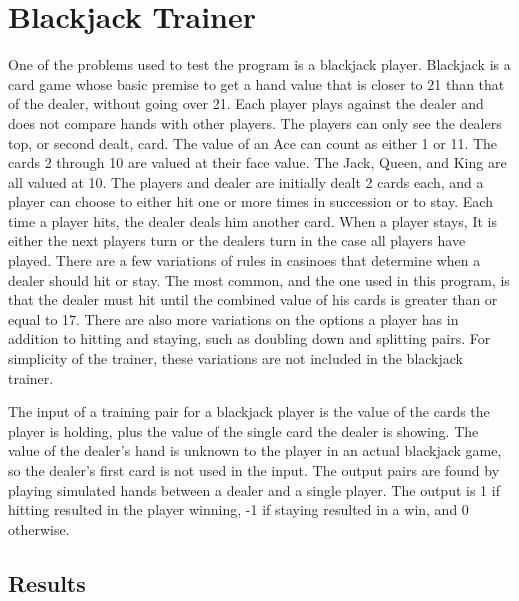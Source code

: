 \chapter[Blackjack Trainer]{Blackjack Trainer}
One of the problems used to test the program is a blackjack player. 
Blackjack is a card game whose basic premise to get a hand value that is closer to 21 than that of the dealer, without going over 21. 
Each player plays against the dealer and does not compare hands with other players. 
The players can only see the dealers top, or second dealt, card. 
The value of an Ace can count as either 1 or 11. 
The cards 2 through 10 are valued at their face value. 
The Jack, Queen, and King are all valued at 10. 
The players and dealer are initially dealt 2 cards each, and a player can choose to either hit one or more times in succession or to stay. 
Each time a player hits, the dealer deals him another card. 
When a player stays, It is either the next players turn or the dealers turn in the case all players have played. 
There are a few variations of rules in casinoes that determine when a dealer should hit or stay. 
The most common, and the one used in this program, is that the dealer must hit until the combined value of his cards is greater than or equal to 17. 
There are also more variations on the options a player has in addition to hitting and staying, such as doubling down and splitting pairs. 
For simplicity of the trainer, these variations are not included in the blackjack trainer.

The input of a training pair for a blackjack player is the value of the cards the player is holding, plus the value of the single card the dealer is showing. 
The value of the dealer's hand is unknown to the player in an actual blackjack game, so the dealer's first card is not used in the input. 
The output pairs are found by playing simulated hands between a dealer and a single player. 
The output is 1 if hitting resulted in the player winning, -1 if staying resulted in a win, and 0 otherwise.

\section{Results}

